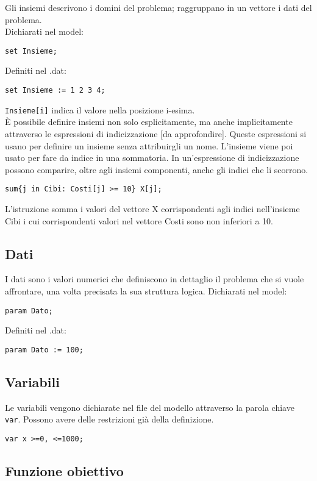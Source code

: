 Gli insiemi descrivono i domini del problema; raggruppano in un vettore i dati del problema. \\
Dichiarati nel model:
\begin{verbatim}
set Insieme;
\end{verbatim}
Definiti nel .dat:
\begin{verbatim}
set Insieme := 1 2 3 4;
\end{verbatim}
\texttt{Insieme[i]} indica il valore nella posizione i-esima. \\

È possibile definire insiemi non solo esplicitamente, ma anche implicitamente attraverso le espressioni di indicizzazione [da approfondire]. Queste espressioni si usano per definire un insieme senza attribuirgli un nome. L'insieme viene poi usato per fare da indice in una sommatoria. In un'espressione di indicizzazione possono comparire, oltre agli insiemi componenti, anche gli indici che li scorrono.
\begin{verbatim}
sum{j in Cibi: Costi[j] >= 10} X[j];
\end{verbatim}
L'istruzione somma i valori del vettore X corrispondenti agli indici nell'insieme Cibi i cui corrispondenti valori nel vettore Costi sono non inferiori a 10.

\subsection{Dati}
I dati sono i valori numerici che definiscono in dettaglio il problema che si vuole affrontare, una volta precisata la sua struttura logica. 
Dichiarati nel model:
\begin{verbatim}
param Dato;
\end{verbatim}
Definiti nel .dat:
\begin{verbatim}
param Dato := 100;
\end{verbatim}

\subsection{Variabili}

Le variabili vengono dichiarate nel file del modello attraverso la parola chiave \texttt{var}. Possono avere delle restrizioni già della definizione.
\begin{verbatim}
var x >=0, <=1000; 
\end{verbatim}

\subsection{Funzione obiettivo}

